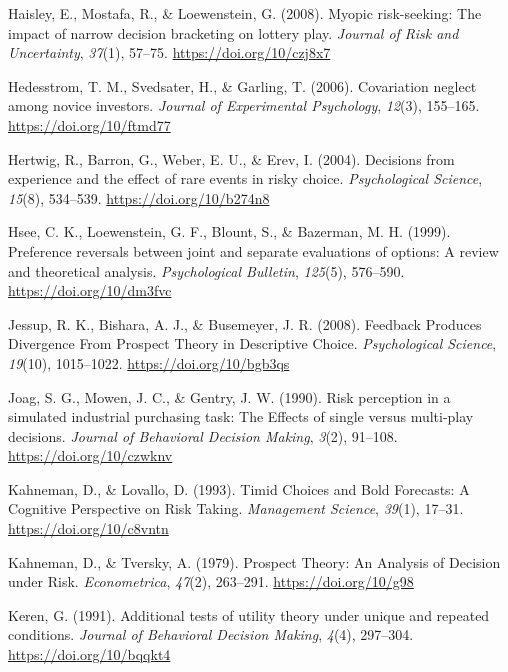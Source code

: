 \documentclass[
  english,
  man, donotrepeattitle,floatsintext]{apa7}
\newlength{\cslhangindent}
\newenvironment{cslreferences}%
  {\setlength{\parindent}{0pt}%
  \everypar{\setlength{\hangindent}{\cslhangindent}}\ignorespaces}%
  {\par}
\theoremstyle{definition}
\theoremstyle{definition}
\theoremstyle{definition}
\theoremstyle{definition}
\theoremstyle{remark}
\begin{document}
\begin{cslreferences}
\leavevmode\hypertarget{ref-haisley2008}{}%
Haisley, E., Mostafa, R., \& Loewenstein, G. (2008). Myopic risk-seeking: The impact of narrow decision bracketing on lottery play. \emph{Journal of Risk and Uncertainty}, \emph{37}(1), 57--75. \url{https://doi.org/10/czj8x7}

\leavevmode\hypertarget{ref-hedesstrom2006}{}%
Hedesstrom, T. M., Svedsater, H., \& Garling, T. (2006). Covariation neglect among novice investors. \emph{Journal of Experimental Psychology}, \emph{12}(3), 155--165. \url{https://doi.org/10/ftmd77}

\leavevmode\hypertarget{ref-hertwig2004}{}%
Hertwig, R., Barron, G., Weber, E. U., \& Erev, I. (2004). Decisions from experience and the effect of rare events in risky choice. \emph{Psychological Science}, \emph{15}(8), 534--539. \url{https://doi.org/10/b274n8}

\leavevmode\hypertarget{ref-hsee1999}{}%
Hsee, C. K., Loewenstein, G. F., Blount, S., \& Bazerman, M. H. (1999). Preference reversals between joint and separate evaluations of options: A review and theoretical analysis. \emph{Psychological Bulletin}, \emph{125}(5), 576--590. \url{https://doi.org/10/dm3fvc}

\leavevmode\hypertarget{ref-jessup2008}{}%
Jessup, R. K., Bishara, A. J., \& Busemeyer, J. R. (2008). Feedback Produces Divergence From Prospect Theory in Descriptive Choice. \emph{Psychological Science}, \emph{19}(10), 1015--1022. \url{https://doi.org/10/bgb3qs}

\leavevmode\hypertarget{ref-joag1990}{}%
Joag, S. G., Mowen, J. C., \& Gentry, J. W. (1990). Risk perception in a simulated industrial purchasing task: The Effects of single versus multi-play decisions. \emph{Journal of Behavioral Decision Making}, \emph{3}(2), 91--108. \url{https://doi.org/10/czwknv}

\leavevmode\hypertarget{ref-kahneman1993}{}%
Kahneman, D., \& Lovallo, D. (1993). Timid Choices and Bold Forecasts: A Cognitive Perspective on Risk Taking. \emph{Management Science}, \emph{39}(1), 17--31. \url{https://doi.org/10/c8vntn}

\leavevmode\hypertarget{ref-kahneman1979}{}%
Kahneman, D., \& Tversky, A. (1979). Prospect Theory: An Analysis of Decision under Risk. \emph{Econometrica}, \emph{47}(2), 263--291. \url{https://doi.org/10/g98}

\leavevmode\hypertarget{ref-keren1991}{}%
Keren, G. (1991). Additional tests of utility theory under unique and repeated conditions. \emph{Journal of Behavioral Decision Making}, \emph{4}(4), 297--304. \url{https://doi.org/10/bqqkt4}


\end{cslreferences}
\end{document}
